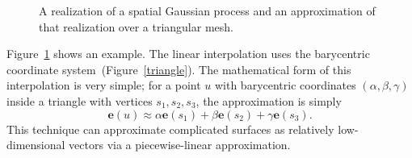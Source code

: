 \documentclass{interact}
\begin{document}
\begin{figure}[t!]
\centering
{}

\caption{A realization of a spatial Gaussian process and an
approximation of that realization over a triangular mesh.}
\label{surface}
\end{figure}
Figure~\ref{surface}
shows an example. The linear interpolation uses the barycentric coordinate
system~(Figure~\ref{triangle}). The mathematical form of this interpolation is
very simple; for a point \(u\) with barycentric coordinates \((\alpha, \beta,
\gamma)\) inside a triangle with vertices \(s_{1}, s_{2}, s_{3}\), the
approximation is simply
\begin{equation}
\mathbf{e}(u) \approx \alpha \mathbf{e}(s_{1})
+ \beta \mathbf{e}(s_{2}) + \gamma \mathbf{e}(s_{3}).
\end{equation}
This technique can approximate complicated surfaces as relatively
low-dimensional vectors via a piecewise-linear approximation.
\end{document}
